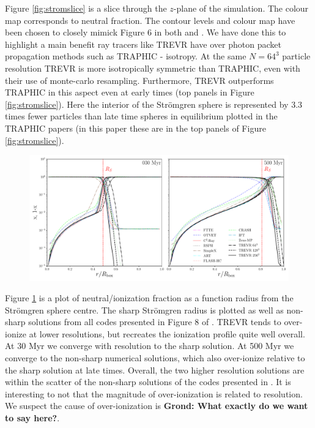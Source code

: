 \documentclass[fleq,usenatbib]{mnras}
\newcommand{\acro}{TREVR}
\newcommand{\comment}[1]{\textbf{\color{red}#1}}
\newcommand{\strom}{Str\"omgren}
\begin{document}
Figure \ref{fig:stromslice} is a slice through the $z$-plane of the 
simulation. The colour map corresponds to neutral fraction. The contour 
levels and colour map have been chosen to closely mimick Figure 6 in both 
\cite{pawlikSchaye08} and \cite{pawlikSchaye11}. We have done this to 
highlight a main benefit ray tracers like \acro{} have over photon packet 
propagation methods such as TRAPHIC - isotropy. At the same $N=64^3$ particle 
resolution \acro{} is more isotropically symmetric than TRAPHIC, even with 
their use of monte-carlo resampling. Furthermore, \acro{} outperforms TRAPHIC 
in this aspect even at early times (top panels in Figure 
\ref{fig:stromslice}). Here the interior of the \strom{} sphere is represented 
by 3.3 times fewer particles than late time spheres in equilibrium plotted in 
the TRAPHIC papers (in this paper these are in the top panels of Figure 
\ref{fig:stromslice}).

\begin{figure}
\includegraphics[width=0.95\linewidth]{Figures/strom_iso_fraction.pdf}
\caption{}
\label{fig:stromiso}
\end{figure}
Figure \ref{fig:stromiso} is a plot of neutral/ionization fraction as a 
function radius from the \strom{} sphere centre. The sharp \strom{} radius is 
plotted as well as non-sharp solutions from all codes presented in Figure 8 
of \cite{ilievEt06}. \acro{} tends to over-ionize at lower resolutions, but 
recreates the ionization profile quite well overall. At 30 Myr we converge 
with resolution to the sharp solution. At 500 Myr we converge to the non-sharp 
numerical solutions, which also over-ionize relative to the sharp solution at 
late times. Overall, the two higher resolution solutions are within the 
scatter of the non-sharp solutions of the codes presented in \cite{ilievEt06}. 
It is interesting to not that the magnitude of over-ionization is related to 
resolution. We suspect the cause of over-ionization is \comment{Grond: What 
exactly do we want to say here?}.
\end{document}
